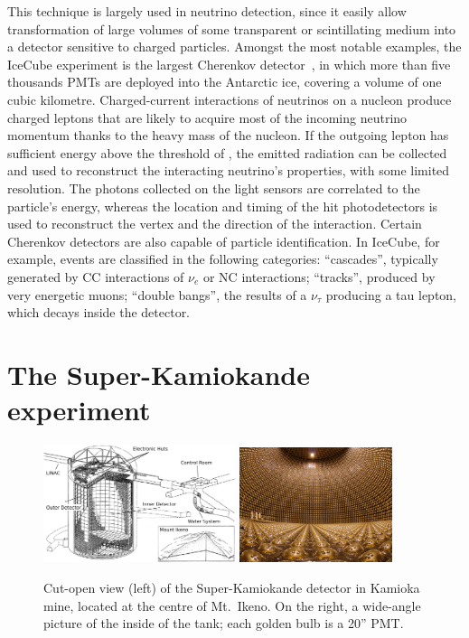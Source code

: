 This technique is largely used in neutrino detection, since it easily allow %
transformation of large volumes of some transparent or scintillating medium into a detector sensitive to charged particles.
Amongst the most notable examples, the IceCube experiment is the largest Cherenkov detector~\cite{Abbasi:2008aa}, %
in which more than five thousands PMTs are deployed into the Antarctic ice, covering a volume of one cubic kilometre.
Charged-current interactions of neutrinos on a nucleon produce charged leptons %
that are likely to acquire most of the incoming neutrino momentum thanks to the heavy mass of the nucleon.
If the outgoing lepton has sufficient energy above the threshold of , %
the emitted radiation can be collected and used to reconstruct the interacting neutrino's properties, with some limited resolution.
The photons collected on the light sensors are correlated to the particle's energy, %
whereas the location and timing of the hit photodetectors is used to reconstruct the vertex %
and the direction of the interaction.
Certain Cherenkov detectors are also capable of particle identification.
In IceCube, for example, events are classified in the following categories:
``cascades'', typically generated by CC interactions of $\nu_e$ or NC interactions;
``tracks'', produced by very energetic muons; ``double bangs'', %
the results of a $\nu_\tau$ producing a tau lepton, which decays inside the detector.

\section{The Super-Kamiokande experiment}
\label{sec:sk}

\begin{figure}
	\centering
	\includegraphics[width=0.50\textwidth]{pics/superk-schematic-tags.png}
	\includegraphics[width=0.40\textwidth]{pics/superk-internal.jpeg}
	\caption{Cut-open view (left) of the Super-Kamiokande detector in Kamioka mine, %
	       located at the centre of Mt.\ Ikeno.
	       On the right, a wide-angle picture of the inside of the tank; each golden bulb is a 20'' PMT.}
	\label{fig:sk_scheme}
\end{figure}

